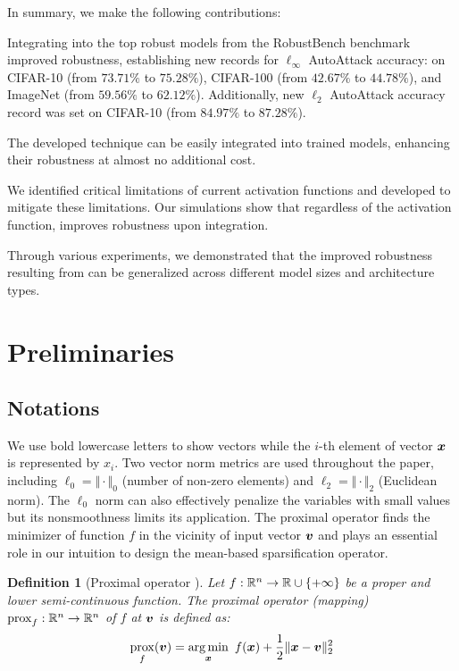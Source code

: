 \documentclass[conference]{IEEEtran}
\newtheorem{definition}{Definition}
\newcommand{\argmin}{\operatornamewithlimits{arg\,min}}
\begin{document}
In summary, we make the following  contributions:
\begin{compactitem}
    \item {Integrating \sys into the top robust models from the RobustBench benchmark~\mbox{\cite{rasca20}} improved robustness, establishing new records for $\ell_\infty$ AutoAttack accuracy: on CIFAR-10 (from $73.71\%$ to $75.28\%$), CIFAR-100 (from $42.67\%$ to $44.78\%$), and ImageNet (from $59.56\%$ to $62.12\%$). Additionally, new $\ell_2$ AutoAttack accuracy record was set on CIFAR-10 (from $84.97\%$ to $87.28\%$).
    \item The developed \sys technique can be easily integrated into trained models, enhancing their robustness at almost no additional cost.
    \item We identified critical limitations of current activation functions and developed \sys to mitigate these limitations. Our simulations show that regardless of the activation function, \sys improves robustness upon integration.
    \item Through various experiments, we demonstrated that the improved robustness resulting from \sys can be generalized across different model sizes and architecture types.}
\end{compactitem}




\section{Preliminaries}\label{sec:preliminary}

\subsection{Notations}\label{sec:notions}
We use bold lowercase letters to show vectors while the $i$-th element of vector $\boldsymbol{x}$ is represented by $x_i$.  Two vector norm metrics are used throughout the paper, including $\ell_0=\Vert\cdot\Vert_0$ (number of non-zero elements) and $\ell_2=\Vert\cdot\Vert_2$ (Euclidean norm). The $\ell_0$ norm can also effectively penalize the variables with small values but its nonsmoothness limits its application. The proximal operator finds the minimizer of function $f$ in the vicinity of input vector $\boldsymbol{v}$ and plays an essential role in our intuition to design the mean-based sparsification operator.
\begin{definition}[Proximal operator \cite{papb14}]\label{def_prox}
    Let $f:\mathbb{R}^n\rightarrow \mathbb{R}\cup \{+\infty\}$ be a proper and lower semi-continuous function. The proximal operator (mapping) $\mathop{\mathrm{prox}}_f:\mathbb{R}^n\rightarrow\mathbb{R}^n$ of $f$ at $\boldsymbol{v}$ is defined as:
    \begin{align}
       \prox_f(\vbn)=\argmin_{\xb}~f(\xb)+\frac{1}{2}\Vert\xb-\vbn\Vert_2^2\label{eq:prox}
    \end{align}
\end{definition}
\end{document}
